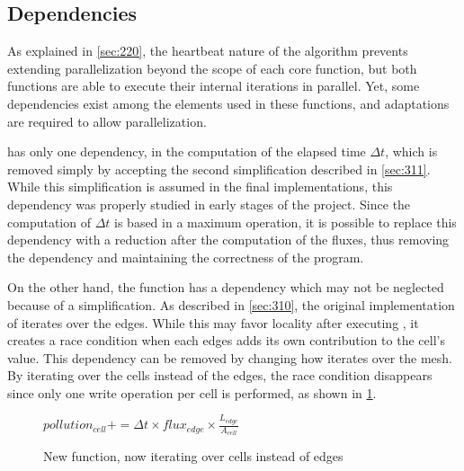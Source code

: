 \subsection{Dependencies}
\label{sec:330}



As explained in \cref{sec:220}, the heartbeat nature of the algorithm prevents extending parallelization beyond the scope of each core function, but both functions are able to execute their internal iterations in parallel.
Yet, some dependencies exist among the elements used in these functions, and adaptations are required to allow parallelization.

\computeflux has only one dependency, in the computation of the elapsed time $\Delta t$, which is removed simply by accepting the second simplification described in \cref{sec:311}.
While this simplification is assumed in the final implementations, this dependency was properly studied in early stages of the project.
Since the computation of $\Delta t$ is based in a maximum operation, it is possible to replace this dependency with a reduction after the computation of the fluxes, thus removing the dependency and maintaining the correctness of the program.

On the other hand, the \update function has a dependency which may not be neglected because of a simplification.
As described in \cref{sec:310}, the original implementation of \update iterates over the edges.
While this may favor locality after executing \computeflux, it creates a race condition when each edges adds its own contribution to the cell's value.
This dependency can be removed by changing how \update iterates over the mesh. By iterating over the cells instead of the edges, the race condition disappears since only one write operation per cell is performed, as shown in \cref{alg:update2}.

\begin{figure}[!htp]
	\begin{alg}
				\State $pollution_{cell} += \Delta{t} \times flux_{edge} \times \frac{L_{edge}}{A_{cell}}$
			\EndFor
		\EndFor
	\end{alg}

	\caption{New \update function, now iterating over cells instead of edges}
	\label{alg:update2}
\end{figure}
